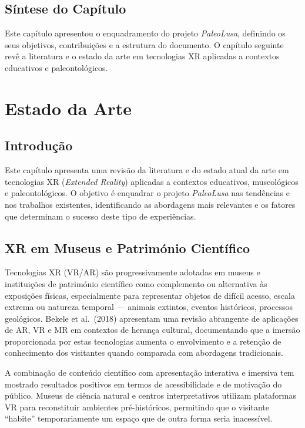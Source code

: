 \documentclass[a4paper,11pt]{report}
\newcommand{\blankpage}{%
    \newpage
    \thispagestyle{empty}
    \mbox{}
    \newpage
}
\begin{document}
\section{Síntese do Capítulo}

Este capítulo apresentou o enquadramento do projeto \textit{PaleoLusa},
definindo os seus objetivos, contribuições e a estrutura do documento.
O capítulo seguinte revê a literatura e o estado da arte em tecnologias XR
aplicadas a contextos educativos e paleontológicos.

\blankpage

\chapter{Estado da Arte}

\section{Introdução}

Este capítulo apresenta uma revisão da literatura e do estado atual da arte
em tecnologias XR (\textit{Extended Reality}) aplicadas a contextos educativos,
museológicos e paleontológicos. O objetivo é enquadrar o projeto
\textit{PaleoLusa} nas tendências e nos trabalhos existentes, identificando
as abordagens mais relevantes e os fatores que determinam o sucesso deste
tipo de experiências.

\section{XR em Museus e Património Científico}

Tecnologias XR (VR/AR) são progressivamente adotadas em museus e instituições
de património científico como complemento ou alternativa às exposições físicas,
especialmente para representar objetos de difícil acesso, escala extrema ou
natureza temporal --- animais extintos, eventos históricos, processos geológicos.
Bekele et al.\ (2018) apresentam uma revisão abrangente de aplicações de AR, VR
e MR em contextos de herança cultural, documentando que a imersão proporcionada
por estas tecnologias aumenta o envolvimento e a retenção de conhecimento dos
visitantes quando comparada com abordagens tradicionais.

A combinação de conteúdo científico com apresentação interativa e imersiva tem
mostrado resultados positivos em termos de acessibilidade e de motivação do
público. Museus de ciência natural e centros interpretativos utilizam plataformas
VR para reconstituir ambientes pré-históricos, permitindo que o visitante
``habite'' temporariamente um espaço que de outra forma seria inacessível.
\end{document}
